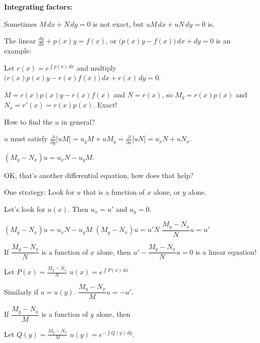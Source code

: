 \documentclass[10pt,aspectratio=169]{beamer}
\begin{document}
\begin{frame}
\textbf{Integrating factors:}

Sometimes \quad $M\, dx + N \, dy = 0$ \quad is not exact, but \quad $u M \, dx + u N \, dy = 0$ \quad is.

\medskip
\pause

The linear
\quad
$\displaystyle
\frac{dy}{dx} + p(x) y = f(x)$, \quad
or \quad $\bigl( p(x) y - f(x) \bigr)\, dx +  dy  = 0$ \quad
is an example:

\medskip
\pause

Let $r(x) = e^{\int p(x)\,dx}$ and multiply
\qquad
$\displaystyle
\bigl(r(x) p(x) y - r(x) f(x) \bigr)\, dx + r(x) \, dy = 0$.

\medskip
\pause

$M = r(x) p(x) y - r(x) f(x)$ and $N=r(x)$,
\pause so
\quad
$M_y = r(x) p(x)$ and $N_x = r'(x) = r(x) p(x)$.
\quad
\pause
Exact!

\medskip
\pause

How to find the $u$ in general?

\medskip
\pause

$u$ must satisfy
\quad
$\displaystyle
\frac{\partial}{\partial y} \bigl[ u M \bigr] = 
u_y M + u M_y = 
\frac{\partial}{\partial x} \bigl[ u N \bigr] = 
u_x N + u N_x$.

\medskip
\pause

\thus \quad
$(M_y-N_x)u = u_x N - u_y M$.

\medskip
\pause

OK, that's another differential equation, how does that help?

\medskip
\pause

One strategy: Look for $u$ that is a function of $x$ alone, or $y$ alone.

\end{frame}

\begin{frame}
Let's look for $u(x)$.  Then $u_x = u'$ and $u_y = 0$.

\medskip
\pause

$(M_y-N_x)u = u_x N - u_y M$
\pause
\wthus
$(M_y-N_x)u = u' N$
\pause
\wthus
$\dfrac{M_y-N_x}{N}u = u'$

\medskip
\pause

If $\dfrac{M_y-N_x}{N}$ is a function of $x$ alone, then
\quad
$u' - \dfrac{M_y-N_x}{N} u = 0$ \quad is a linear equation!

\medskip
\pause

Let $P(x) = \frac{M_y-N_x}{N}$
\wthus
$u(x) = e^{\int P(x) \, dx}$

\medskip
\pause

Similarly if $u = u(y)$.
\pause
\wthus
$\dfrac{M_y-N_x}{M} u = - u'$.

\medskip
\pause

If $\dfrac{M_y-N_x}{M}$ is a function of $y$ alone, then

\medskip
\pause

Let $Q(y) = \frac{M_y-N_x}{M}$
\wthus
$u(y) = e^{-\int Q(y) \, dy}$.

\end{frame}
\end{document}
